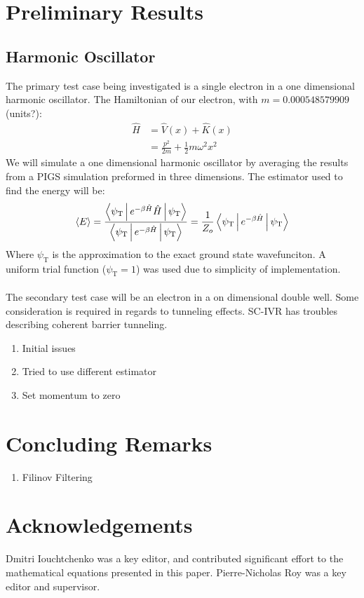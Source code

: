 \documentclass[12pt,letterpaper,oneside,final,titlepage]{article}               %
\numberwithin{equation}{section} %
\newcommand{\psiT}{\psi_{\textrm{T}}}
\begin{document}
\section{Preliminary Results}

\subsection*{Harmonic Oscillator}
The primary test case being investigated is a single electron in a one dimensional harmonic oscillator. 
The Hamiltonian of our electron, with $m = \num{0.000548579909}$ (units?): 
\begin{align}
	\hat{H} &= \hat{V}(x) + \hat{K}(x) \\
			&= \frac{p^2}{2m} + \frac{1}{2} m \omega^{2} x^{2} 
\end{align}
We will simulate a one dimensional harmonic oscillator by averaging the results from a PIGS simulation preformed in three dimensions. 
The estimator used to find the energy will be:
\begin{equation}
	\Braket{E} = \frac{\Braket{\psiT|e^{-\beta\hat{H}}\hat{H}|\psiT}}{\Braket{\psiT|e^{-\beta\hat{H}}|\psiT}} = \frac{1}{Z_{o}} \Braket{\psiT|e^{-\beta\hat{H}}|\psiT}
\end{equation}
Where $\psiT$ is the approximation to the exact ground state wavefunciton. A uniform trial function ($\psiT = 1$) was used due to simplicity of implementation.
\\ \\
The secondary test case will be an electron in a on dimensional double well. Some consideration is required in regards to tunneling effects. SC-IVR has troubles describing coherent barrier tunneling.

\begin{enumerate}
	\item Initial issues
	\item Tried to use different estimator
	\item Set momentum to zero
\end{enumerate}

\section{Concluding Remarks}
\begin{enumerate}
	\item Filinov Filtering
\end{enumerate}


\section{Acknowledgements}
Dmitri Iouchtchenko was a key editor, and contributed significant effort to the mathematical equations presented in this paper. Pierre-Nicholas Roy was a key editor and supervisor.

\renewcommand*{\bibfont}{\scriptsize}
\printbibliography
\end{document}
